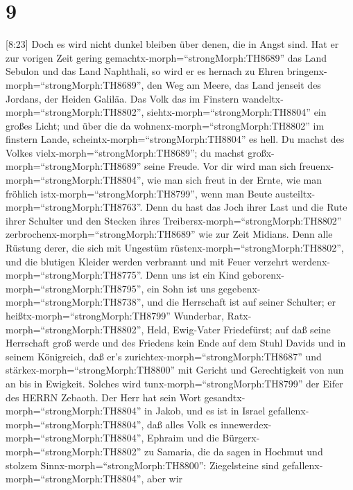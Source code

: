 \hypertarget{section-8}{%
\section{9}\label{section-8}}

 {[}8:23{]} Doch es wird nicht dunkel bleiben über denen,
die in Angst sind. Hat er zur vorigen Zeit gering
gemachtx-morph=``strongMorph:TH8689'' das Land Sebulon und das Land
Naphthali, so wird er es hernach zu Ehren
bringenx-morph=``strongMorph:TH8689'', den Weg am Meere, das Land
jenseit des Jordans, der Heiden Galiläa.  Das Volk das im
Finstern wandeltx-morph=``strongMorph:TH8802'',
siehtx-morph=``strongMorph:TH8804'' ein großes Licht; und über die da
wohnenx-morph=``strongMorph:TH8802'' im finstern Lande,
scheintx-morph=``strongMorph:TH8804'' es hell.  Du machst
des Volkes vielx-morph=``strongMorph:TH8689''; du machst
großx-morph=``strongMorph:TH8689'' seine Freude. Vor dir wird man sich
freuenx-morph=``strongMorph:TH8804'', wie man sich freut in der Ernte,
wie man fröhlich istx-morph=``strongMorph:TH8799'', wenn man Beute
austeiltx-morph=``strongMorph:TH8763''.  Denn du hast das
Joch ihrer Last und die Rute ihrer Schulter und den Stecken ihres
Treibersx-morph=``strongMorph:TH8802''
zerbrochenx-morph=``strongMorph:TH8689'' wie zur Zeit Midians.
 Denn alle Rüstung derer, die sich mit Ungestüm
rüstenx-morph=``strongMorph:TH8802'', und die blutigen Kleider werden
verbrannt und mit Feuer verzehrt werdenx-morph=``strongMorph:TH8775''.
 Denn uns ist ein Kind
geborenx-morph=``strongMorph:TH8795'', ein Sohn ist uns
gegebenx-morph=``strongMorph:TH8738'', und die Herrschaft ist auf seiner
Schulter; er heißtx-morph=``strongMorph:TH8799'' Wunderbar,
Ratx-morph=``strongMorph:TH8802'', Held, Ewig-Vater Friedefürst;
 auf daß seine Herrschaft groß werde und des Friedens kein
Ende auf dem Stuhl Davids und in seinem Königreich, daß er's
zurichtex-morph=``strongMorph:TH8687'' und
stärkex-morph=``strongMorph:TH8800'' mit Gericht und Gerechtigkeit von
nun an bis in Ewigkeit. Solches wird tunx-morph=``strongMorph:TH8799''
der Eifer des HERRN Zebaoth.  Der Herr hat sein Wort
gesandtx-morph=``strongMorph:TH8804'' in Jakob, und es ist in Israel
gefallenx-morph=``strongMorph:TH8804'',  daß alles Volk es
innewerdex-morph=``strongMorph:TH8804'', Ephraim und die
Bürgerx-morph=``strongMorph:TH8802'' zu Samaria, die da sagen in Hochmut
und stolzem Sinnx-morph=``strongMorph:TH8800'': 
Ziegelsteine sind gefallenx-morph=``strongMorph:TH8804'', aber wir
